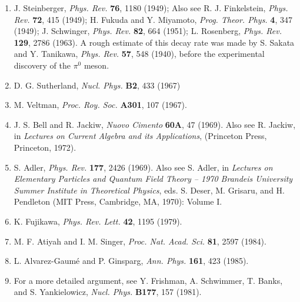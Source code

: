 \begin{enumerate}
\item {}\label{ch22-ref-1}
J. Steinberger, \emph{Phys. Rev.} \textbf{76}, 1180 (1949); Also see
R. J. Finkelstein, \emph{Phys. Rev.} \textbf{72}, 415 (1949);
H. Fukuda and Y. Miyamoto, \emph{Prog. Theor. Phys.} \textbf{4}, 347
(1949); J. Schwinger, \emph{Phys. Rev.} \textbf{82}, 664 (1951);
L. Rosenberg, \emph{Phys. Rev.} \textbf{129}, 2786 (1963). A rough
estimate of this decay rate was made by S. Sakata and Y. Tanikawa,
\emph{Phys. Rev.} \textbf{57}, 548 (1940), before the experimental
discovery of the $\pi^0$ meson.

\item {}\label{ch22-ref-2}
D. G. Sutherland, \emph{Nucl. Phys.} \textbf{B2}, 433 (1967)

\item {}\label{ch22-ref-3}
M. Veltman, \emph{Proc. Roy. Soc.} \textbf{A301}, 107 (1967).

\item {}\label{ch22-ref-4}
J. S. Bell and R. Jackiw, \emph{Nuovo Cimento} \textbf{60A}, 47 (1969).
Also see R. Jackiw, in \emph{Lectures on Current Algebra and its
Applications}, (Princeton Press, Princeton, 1972).

\item {}\label{ch22-ref-5}
S. Adler, \emph{Phys. Rev.} \textbf{177}, 2426 (1969). Also see S. Adler,
in \emph{Lectures on Elementary Particles and Quantum Field Theory --
1970 Brandeis University Summer Institute in Theoretical Physics}, eds.
S. Deser, M. Grisaru, and H. Pendleton (MIT Press, Cambridge, MA, 1970):
Volume I.

\item {}\label{ch22-ref-6}
K. Fujikawa, \emph{Phys. Rev. Lett.} \textbf{42}, 1195 (1979).

\item[6a.] \label{ch22-ref-6a}
M. F. Atiyah and I. M. Singer, \emph{Proc. Nat. Acad. Sci.} \textbf{81},
2597 (1984).

\item {}\label{ch22-ref-7}
L. Alvarez-Gaum\'e and P. Ginsparg, \emph{Ann. Phys.} \textbf{161}, 423
(1985).

\item[7a.] \label{ch22-ref-7a}
For a more detailed argument, see Y. Frishman, A. Schwimmer, T. Banks,
and S. Yankielowicz, \emph{Nucl. Phys.} \textbf{B177}, 157 (1981).


\end{enumerate}
